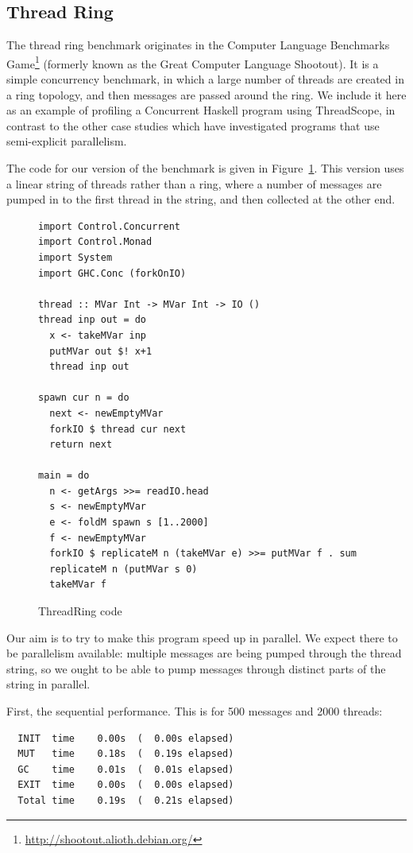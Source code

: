 \subsection{Thread Ring}

The thread ring benchmark originates in the Computer Language
Benchmarks Game\footnote{\url{http://shootout.alioth.debian.org/}}
(formerly known as the Great Computer Language Shootout).  It is a
simple concurrency benchmark, in which a large number of threads are
created in a ring topology, and then messages are passed around the
ring.  We include it here as an example of profiling a Concurrent
Haskell program using ThreadScope, in contrast to the other case
studies which have investigated programs that use semi-explicit
parallelism.

The code for our version of the benchmark is given in
Figure~\ref{f:threadring-code}.  This version uses a linear string of
threads rather than a ring, where a number of messages are pumped in
to the first thread in the string, and then collected at the other
end.

\begin{figure}
\begin{lstlisting}
import Control.Concurrent
import Control.Monad
import System
import GHC.Conc (forkOnIO)

thread :: MVar Int -> MVar Int -> IO ()
thread inp out = do 
  x <- takeMVar inp
  putMVar out $! x+1
  thread inp out

spawn cur n = do 
  next <- newEmptyMVar
  forkIO $ thread cur next
  return next

main = do 
  n <- getArgs >>= readIO.head
  s <- newEmptyMVar
  e <- foldM spawn s [1..2000]
  f <- newEmptyMVar
  forkIO $ replicateM n (takeMVar e) >>= putMVar f . sum
  replicateM n (putMVar s 0)
  takeMVar f
\end{lstlisting}
\caption{ThreadRing code}
\label{f:threadring-code}
\end{figure}

Our aim is to try to make this program speed up in parallel.  We
expect there to be parallelism available: multiple messages are
being pumped through the thread string, so we ought to be able to pump
messages through distinct parts of the string in parallel.

First, the sequential performance.  This is for 500 messages and 2000 threads:

\begin{verbatim}
  INIT  time    0.00s  (  0.00s elapsed)
  MUT   time    0.18s  (  0.19s elapsed)
  GC    time    0.01s  (  0.01s elapsed)
  EXIT  time    0.00s  (  0.00s elapsed)
  Total time    0.19s  (  0.21s elapsed)
\end{verbatim}

